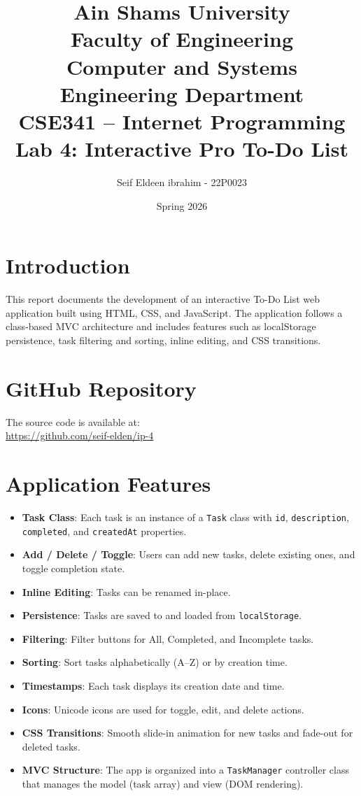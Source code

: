 \documentclass[12pt,a4paper]{article}
\title{
    \vspace{-1cm}
    \Large\textbf{Ain Shams University} \\
    \large Faculty of Engineering \\
    \large Computer and Systems Engineering Department \\
    \vspace{0.5cm}
    \LARGE\textbf{CSE341 -- Internet Programming} \\
    \vspace{0.3cm}
    \Large Lab 4: Interactive Pro To-Do List \\
    \vspace{0.5cm}
}
\author{Seif Eldeen ibrahim - 22P0023}
\date{Spring 2026}
\begin{document}
\maketitle
\thispagestyle{fancy}

\section{Introduction}
This report documents the development of an interactive To-Do List web application built using HTML, CSS, and JavaScript. The application follows a class-based MVC architecture and includes features such as localStorage persistence, task filtering and sorting, inline editing, and CSS transitions.

\section{GitHub Repository}
The source code is available at: \\
\url{https://github.com/seif-elden/ip-4}

\section{Application Features}
\begin{itemize}
    \item \textbf{Task Class}: Each task is an instance of a \texttt{Task} class with \texttt{id}, \texttt{description}, \texttt{completed}, and \texttt{createdAt} properties.
    \item \textbf{Add / Delete / Toggle}: Users can add new tasks, delete existing ones, and toggle completion state.
    \item \textbf{Inline Editing}: Tasks can be renamed in-place.
    \item \textbf{Persistence}: Tasks are saved to and loaded from \texttt{localStorage}.
    \item \textbf{Filtering}: Filter buttons for All, Completed, and Incomplete tasks.
    \item \textbf{Sorting}: Sort tasks alphabetically (A--Z) or by creation time.
    \item \textbf{Timestamps}: Each task displays its creation date and time.
    \item \textbf{Icons}: Unicode icons are used for toggle, edit, and delete actions.
    \item \textbf{CSS Transitions}: Smooth slide-in animation for new tasks and fade-out for deleted tasks.
    \item \textbf{MVC Structure}: The app is organized into a \texttt{TaskManager} controller class that manages the model (task array) and view (DOM rendering).
\end{itemize}
\end{document}
